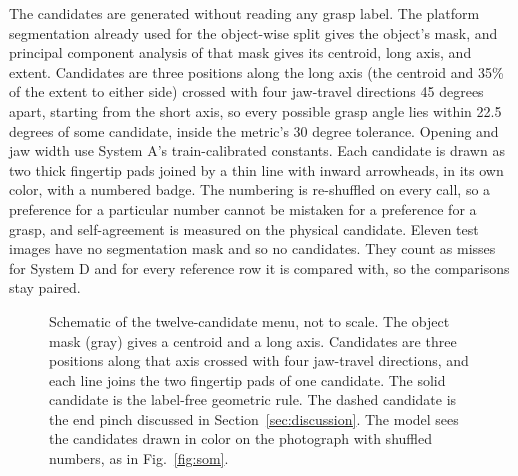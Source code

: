 \documentclass[12pt,letterpaper]{article}
\begin{document}
The candidates are generated without reading any grasp label. The
platform segmentation already used for the object-wise split gives the
object's mask, and principal component analysis of that mask gives its
centroid, long axis, and extent. Candidates are three positions along
the long axis (the centroid and 35\% of the extent to either side)
crossed with four jaw-travel directions 45 degrees apart, starting from
the short axis, so every possible grasp angle lies within 22.5 degrees
of some candidate, inside the metric's 30 degree tolerance. Opening and
jaw width use System A's train-calibrated constants. Each candidate is
drawn as two thick fingertip pads joined by a thin line with inward
arrowheads, in its own color, with a numbered badge. The numbering is
re-shuffled on every call, so a preference for a particular number
cannot be mistaken for a preference for a grasp, and self-agreement is
measured on the physical candidate. Eleven test images have no
segmentation mask and so no candidates. They count as misses for System
D and for every reference row it is compared with, so the comparisons
stay paired.

\begin{figure}[H]
\centering
{}
\caption{Schematic of the twelve-candidate menu, not to scale. The
object mask (gray) gives a centroid and a long axis. Candidates are
three positions along that axis crossed with four jaw-travel
directions, and each line joins the two fingertip pads of one
candidate. The solid candidate is the label-free geometric rule. The
dashed candidate is the end pinch discussed in
Section~\ref{sec:discussion}. The model sees the candidates drawn in
color on the photograph with shuffled numbers, as in
Fig.~\ref{fig:som}.}
\label{fig:menu}
\end{figure}
\end{document}
